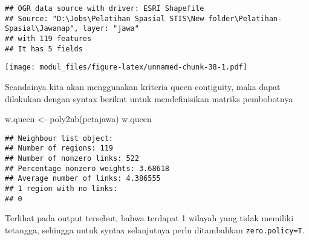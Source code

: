 \documentclass[
]{book}
\newenvironment{Shaded}{\begin{snugshade}}{\end{snugshade}}
\newcommand{\AttributeTok}[1]{\textcolor[rgb]{0.77,0.63,0.00}{#1}}
\newcommand{\DecValTok}[1]{\textcolor[rgb]{0.00,0.00,0.81}{#1}}
\newcommand{\FunctionTok}[1]{\textcolor[rgb]{0.00,0.00,0.00}{#1}}
\newcommand{\NormalTok}[1]{#1}
\newcommand{\OtherTok}[1]{\textcolor[rgb]{0.56,0.35,0.01}{#1}}
\newcommand{\SpecialCharTok}[1]{\textcolor[rgb]{0.00,0.00,0.00}{#1}}
\newcommand{\StringTok}[1]{\textcolor[rgb]{0.31,0.60,0.02}{#1}}
\begin{document}
\begin{verbatim}
## OGR data source with driver: ESRI Shapefile 
## Source: "D:\Jobs\Pelatihan Spasial STIS\New folder\Pelatihan-Spasial\Jawamap", layer: "jawa"
## with 119 features
## It has 5 fields
\end{verbatim}

\begin{Shaded}
\end{Shaded}

\texttt{[image: modul\_files/figure-latex/unnamed-chunk-38-1.pdf]}

Seandainya kita akan menggunakan kriteria queen contiguity, maka dapat dilakukan dengan syntax berikut untuk mendefinisikan matriks pembobotnya

\begin{Shaded}
\begin{Highlighting}[]
\NormalTok{w.queen }\OtherTok{\textless{}{-}} \FunctionTok{poly2nb}\NormalTok{(petajawa)}
\NormalTok{w.queen}
\end{Highlighting}
\end{Shaded}

\begin{verbatim}
## Neighbour list object:
## Number of regions: 119 
## Number of nonzero links: 522 
## Percentage nonzero weights: 3.68618 
## Average number of links: 4.386555 
## 1 region with no links:
## 0
\end{verbatim}

Terlihat pada output tersebut, bahwa terdapat 1 wilayah yang tidak memiliki tetangga, sehingga untuk syntax selanjutnya perlu ditambahkan \texttt{zero.policy=T}.
\end{document}
